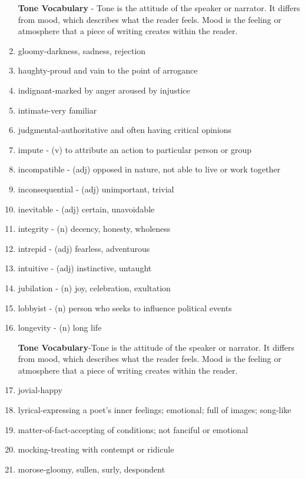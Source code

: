 \begin{enumerate}
\bigskip
\textbf{Tone Vocabulary} - Tone is the attitude of the speaker or narrator.  It differs from mood, which describes what the reader feels. Mood is the feeling or atmosphere that a piece of writing creates within the reader.  


\item gloomy-darkness, sadness, rejection
\item haughty-proud and vain to the point of arrogance
\item indignant-marked by anger aroused by injustice
\item intimate-very familiar
\item judgmental-authoritative and often having critical opinions 

\bigskip
\item impute - (v) to attribute an action to particular person or group
\item incompatible - (adj) opposed in nature, not able to live or work together
\item inconsequential - (adj) unimportant, trivial
\item inevitable - (adj) certain, unavoidable
\item integrity - (n) decency, honesty, wholeness
\item intrepid - (adj) fearless, adventurous
\item intuitive - (adj) instinctive, untaught
\item jubilation - (n) joy, celebration, exultation
\item lobbyist - (n) person who seeks to influence political events
\item longevity - (n) long life

\bigskip
\textbf{Tone Vocabulary}-Tone is the attitude of the speaker or narrator.  It differs from mood, which describes what the reader feels.  Mood is the feeling or atmosphere that a piece of writing creates within the reader.  

\bigskip
\item jovial-happy
\item lyrical-expressing a poet's inner feelings; emotional; full of images; song-like
\item matter-of-fact-accepting of conditions; not fanciful or emotional
\item mocking-treating with contempt or ridicule
\item morose-gloomy, sullen, surly, despondent 


\end{enumerate}
